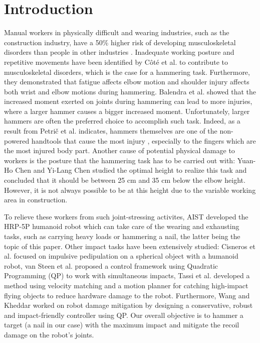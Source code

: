 \documentclass[conference]{IEEEtran}
\begin{document}
\section{Introduction}
\noindent
Manual workers in physically difficult and wearing industries, such as the construction industry, have a 50\% higher risk of developing musculoskeletal disorders than people in other industries \cite{schneiderMusculoskeletalInjuriesConstruction2001}. 
Inadequate working posture and repetitive movements have been identified by Côté et al. \cite{coteDifferencesMultijointKinematic2005} to contribute to musculoskeletal disorders, which is the case for a hammering task. 
Furthermore, they demonstrated that fatigue affects elbow motion and shoulder injury affects both wrist and elbow motions during hammering. 
Balendra et al. \cite{balendraEffectHammerMass2017} showed that the increased moment exerted on joints during hammering can lead to more injuries, where a larger hammer causes a bigger increased moment. 
Unfortunately, larger hammers are often the preferred choice to accomplish such task.
Indeed, as a result from Petrič et al. \cite{petricHammeringDoesNot2017} indicates, hammers themselves are one of the non-powered handtools that cause the most injury \cite{aghazadehInjuriesDueHandtools1987}, especially to the fingers which are the most injured body part. 
Another cause of potential physical damage to workers is the posture that the hammering task has to be carried out with: Yuan-Ho Chen and Yi-Lang Chen \cite{chenOptimalEffectiveWorking2018} studied the optimal height to realize this task and concluded that it should be between 25 cm and 35 cm below the elbow height. 
However, it is not always possible to be at this height due to the variable working area in construction.

To relieve these workers from such joint-stressing activites, AIST developed the HRP-5P humanoid robot \cite{kanekoHumanoidRobotHRP5P2019} which can take care of the wearing and exhausting tasks, such as carrying heavy loads or hammering a nail,
the latter being the topic of this paper. 
Other impact tasks have been extensively studied: Cisneros et al. \cite{cisnerosImpulsivePedipulationSpherical2016} focused on impulsive pedipulation on a spherical object with a humanoid robot,
van Steen et al. \cite{steenRobotControlSimultaneous2022} proposed a control framework using Quadratic Programming (QP) to work with simultaneous impacts,
Tassi et al. \cite{tassiIMAcatcherIMpactawareNonprehensile2025} developed a method using velocity matching and a motion planner for catching high-impact flying objects to reduce hardware damage to the robot. 
Furthermore, Wang and Kheddar \cite{wangImpactFriendlyRobustControl2019} worked on robot damage mitigation by designing a conservative, robust and impact-friendly controller using QP.
Our overall objective is to hammer a target (a nail in our case) with the maximum impact and mitigate the recoil damage on the robot's joints.
\end{document}
